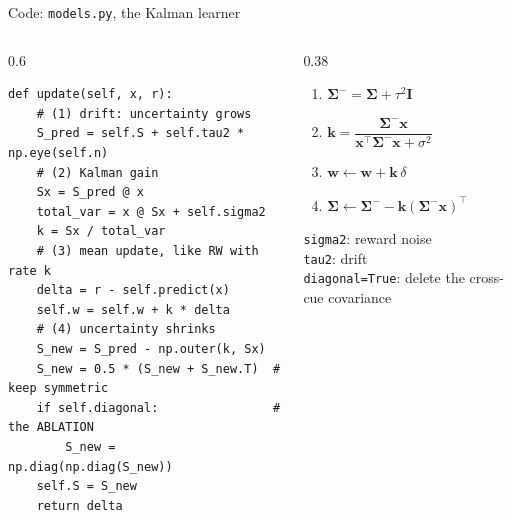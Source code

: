 \documentclass[aspectratio=169,11pt]{beamer}
\newcommand{\x}{\mathbf{x}}
\newcommand{\w}{\mathbf{w}}
\begin{document}
\begin{frame}[fragile]{Code: \texttt{models.py}, the Kalman learner}
\begin{columns}[T]
\begin{column}{0.6\textwidth}
\begin{lstlisting}
def update(self, x, r):
    # (1) drift: uncertainty grows
    S_pred = self.S + self.tau2 * np.eye(self.n)
    # (2) Kalman gain
    Sx = S_pred @ x
    total_var = x @ Sx + self.sigma2
    k = Sx / total_var
    # (3) mean update, like RW with rate k
    delta = r - self.predict(x)
    self.w = self.w + k * delta
    # (4) uncertainty shrinks
    S_new = S_pred - np.outer(k, Sx)
    S_new = 0.5 * (S_new + S_new.T)  # keep symmetric
    if self.diagonal:                # the ABLATION
        S_new = np.diag(np.diag(S_new))
    self.S = S_new
    return delta
\end{lstlisting}
\end{column}
\begin{column}{0.38\textwidth}
\small
\begin{enumerate}
\item $\boldsymbol\Sigma^- = \boldsymbol\Sigma + \tau^2 \mathbf I$
\item $\mathbf k = \dfrac{\boldsymbol\Sigma^-\x}{\x^\top\boldsymbol\Sigma^-\x + \sigma^2}$
\item $\w \leftarrow \w + \mathbf k\,\delta$
\item $\boldsymbol\Sigma \leftarrow \boldsymbol\Sigma^- - \mathbf k(\boldsymbol\Sigma^-\x)^\top$
\end{enumerate}
\vspace{0.4em}
\footnotesize
\texttt{sigma2}: reward noise\\
\texttt{tau2}: drift\\
\texttt{diagonal=True}: delete the cross-cue covariance
\end{column}
\end{columns}
\end{frame}
\end{document}
